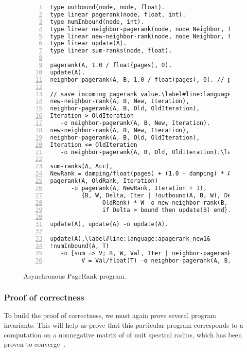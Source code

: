 \begin{figure}[h!]
\begin{Verbatim}[numbers=left,fontsize=\codesize,commandchars=\\\#\&]
type outbound(node, node, float).
type linear pagerank(node, float, int).
type numInbound(node, int).
type linear neighbor-pagerank(node, node Neighbor, float Rank, int Iteration).
type linear new-neighbor-rank(node, node Neighbor, float Rank, int Iteration).
type linear update(A).
type linear sum-ranks(node, float).

pagerank(A, 1.0 / float(pages), 0).
update(A).
neighbor-pagerank(A, B, 1.0 / float(pages), 0). // pagerank of B is ...

// save incoming pagerank value.\label#line:language:apagerank_update1&
new-neighbor-rank(A, B, New, Iteration),
neighbor-pagerank(A, B, Old, OldIteration),
Iteration > OldIteration
   -o neighbor-pagerank(A, B, New, Iteration).
new-neighbor-rank(A, B, New, Iteration),
neighbor-pagerank(A, B, Old, OldIteration),
Iteration <= OldIteration
   -o neighbor-pagerank(A, B, Old, OldIteration).\label#line:language:apagerank_update2&

sum-ranks(A, Acc),
NewRank = damping/float(pages) + (1.0 - damping) * Acc,
pagerank(A, OldRank, Iteration)
      -o pagerank(A, NewRank, Iteration + 1),
         {B, W, Delta, Iter | !outbound(A, B, W), Delta = fabs(NewRank -
               OldRank) * W -o new-neighbor-rank(B, A, NewRank, Iteration + 1),
               if Delta > bound then update(B) end}.

update(A), update(A) -o update(A).

update(A),\label#line:language:apagerank_new1&
!numInbound(A, T)
   -o [sum => V; B, W, Val, Iter | neighbor-pagerank(A, B, Val, Iter),
         V = Val/float(T) -o neighbor-pagerank(A, B, Val, Iter) -> sum-ranks(A, V)].\label#line:language:apagerank_new2&
\end{Verbatim}
\caption{Asynchronous PageRank program.}
\label{language:code:async_pagerank}
\end{figure}

\subsubsection{Proof of correctness}

To build the proof of correctness, we must again prove several program
invariants. This will help us prove that this particular program corresponds to
a computation on a nonnegative matrix of of unit spectral radius, which has been
proven to converge~\cite{DBLP:journals/corr/abs-cs-0606047,
Lubachevsky:1986:CAA:4904.4801}.

